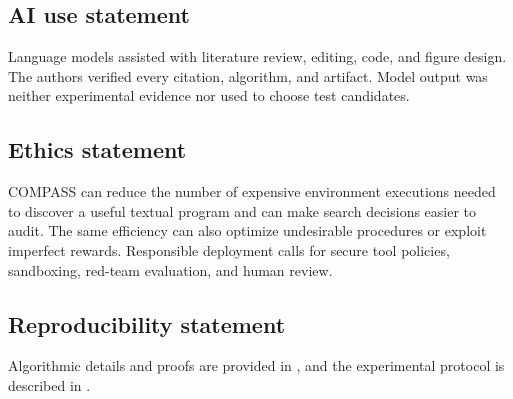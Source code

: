 \subsection*{AI use statement}
Language models assisted with literature review, editing, code, and figure
design.  The authors verified every citation, algorithm, and artifact. Model
output was neither experimental evidence nor used to choose test candidates.

\subsection*{Ethics statement}
COMPASS can reduce the number of expensive environment executions
needed to discover a useful textual program and can make search decisions easier
to audit.  The same efficiency can also optimize undesirable procedures or
exploit imperfect rewards.  Responsible deployment calls for secure tool
policies, sandboxing, red-team evaluation, and human review.

\subsection*{Reproducibility statement}
Algorithmic details and proofs are provided in ,
and the experimental protocol is described in .
